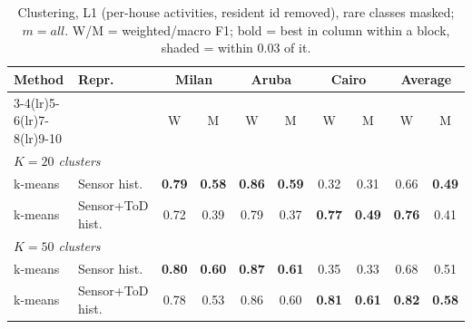 \begin{table}[H]
\centering\small
\caption{Clustering, L1 (per-house activities, resident id removed), rare classes masked; $m=all$. W/M = weighted/macro F1; bold = best in column within a block, shaded = within 0.03 of it.}
\label{tab:clu_l1_masked_mall}
\setlength{\tabcolsep}{3.5pt}
\begin{tabular}{llcc|cc|cc|cc}
\toprule
Method & Repr. & \multicolumn{2}{c}{Milan} & \multicolumn{2}{c}{Aruba} & \multicolumn{2}{c}{Cairo} & \multicolumn{2}{c}{Average} \\
\cmidrule(lr){3-4}\cmidrule(lr){5-6}\cmidrule(lr){7-8}\cmidrule(lr){9-10}
 & & W & M & W & M & W & M & W & M \\
\midrule
\multicolumn{10}{l}{\textit{$K = 20$ clusters}} \\
\midrule
k-means & Sensor hist. & \cellcolor{blue!12}\textbf{0.79} & \cellcolor{blue!12}\textbf{0.58} & \cellcolor{blue!12}\textbf{0.86} & \cellcolor{blue!12}\textbf{0.59} & 0.32 & 0.31 & 0.66 & \cellcolor{blue!12}\textbf{0.49} \\
k-means & Sensor+ToD hist. & 0.72 & 0.39 & 0.79 & 0.37 & \cellcolor{blue!12}\textbf{0.77} & \cellcolor{blue!12}\textbf{0.49} & \cellcolor{blue!12}\textbf{0.76} & 0.41 \\
\midrule
\multicolumn{10}{l}{\textit{$K = 50$ clusters}} \\
\midrule
k-means & Sensor hist. & \cellcolor{blue!12}\textbf{0.80} & \cellcolor{blue!12}\textbf{0.60} & \cellcolor{blue!12}\textbf{0.87} & \cellcolor{blue!12}\textbf{0.61} & 0.35 & 0.33 & 0.68 & 0.51 \\
k-means & Sensor+ToD hist. & \cellcolor{blue!12}0.78 & 0.53 & \cellcolor{blue!12}0.86 & \cellcolor{blue!12}0.60 & \cellcolor{blue!12}\textbf{0.81} & \cellcolor{blue!12}\textbf{0.61} & \cellcolor{blue!12}\textbf{0.82} & \cellcolor{blue!12}\textbf{0.58} \\
\bottomrule
\end{tabular}
\end{table}

